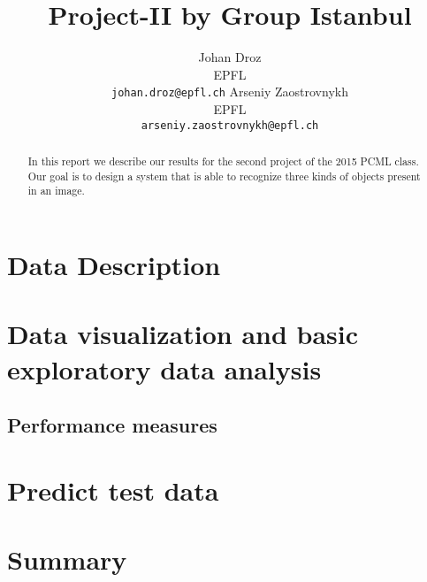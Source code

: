 \documentclass{article} %
\title{Project-II by Group Istanbul}
\author{
Johan Droz\\
EPFL \\
\texttt{johan.droz@epfl.ch} \And
Arseniy Zaostrovnykh\\
EPFL \\
\texttt{arseniy.zaostrovnykh@epfl.ch}
}
\begin{document}
\maketitle

\begin{abstract}
In this report we describe our results for the second project of the 2015 PCML class.
Our goal is to design a system that is able to recognize three kinds of objects present in an image.

\end{abstract}

\section{Data Description}


\section{Data visualization and basic exploratory data analysis}


\subsection{Performance measures}

\section{Predict test data}






\section{Summary}
\end{document}
